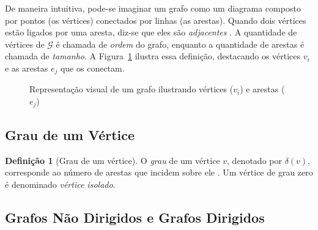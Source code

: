 \documentclass[
  12pt,
  oneside,
  a4paper,
  english,
  brazilian
  ]{abntex2}
\theoremstyle{definition}
\newtheorem{definicao}{Definição}[chapter]
\begin{document}
De maneira intuitiva, pode-se imaginar um grafo como um diagrama composto por
pontos (os vértices) conectados por linhas (as arestas). Quando dois vértices
estão ligados por uma aresta, diz-se que eles são \textit{adjacentes}
\cite{rosen2012}. A quantidade de vértices de $\mathcal{G}$ é chamada de
\textit{ordem} do grafo, enquanto a quantidade de arestas é chamada de
\textit{tamanho}. A Figura~\ref{fig:representacao_grafo_def} ilustra essa
definição, destacando os vértices $v_i$ e as arestas $e_j$ que os conectam.

\begin{figure}[H] 
    \centering
    \caption{Representação visual de um grafo ilustrando vértices ($v_i$) e arestas ($e_j$)}
    \label{fig:representacao_grafo_def}
\end{figure}

\subsection{Grau de um Vértice}

\begin{definicao}[Grau de um vértice]
\label{def:grau}
  O \textit{grau} de um vértice $v$, denotado por $\delta(v)$, corresponde ao
  número de arestas que incidem sobre ele \cite{bondy1976}. Um vértice de grau
  zero é denominado \textit{vértice isolado}.
\end{definicao}

\subsection{Grafos Não Dirigidos e Grafos Dirigidos}
\end{document}
